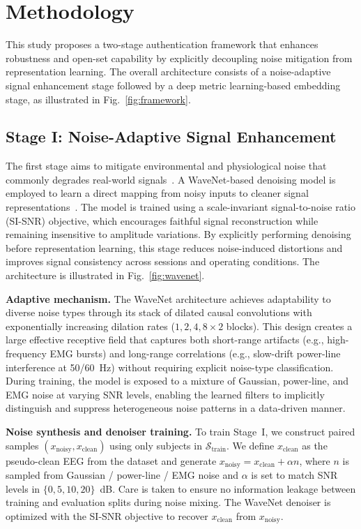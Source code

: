 \documentclass[conference]{IEEEtran}
\begin{document}
\section{Methodology}

This study proposes a two-stage authentication framework that enhances robustness and open-set capability by explicitly decoupling noise mitigation from representation learning. The overall architecture consists of a noise-adaptive signal enhancement stage followed by a deep metric learning-based embedding stage, as illustrated in Fig.~\ref{fig:framework}.

\subsection{Stage I: Noise-Adaptive Signal Enhancement}

The first stage aims to mitigate environmental and physiological noise that commonly degrades real-world signals~\cite{b4}. A WaveNet-based denoising model is employed to learn a direct mapping from noisy inputs to cleaner signal representations~\cite{b14}. The model is trained using a scale-invariant signal-to-noise ratio (SI-SNR) objective, which encourages faithful signal reconstruction while remaining insensitive to amplitude variations. By explicitly performing denoising before representation learning, this stage reduces noise-induced distortions and improves signal consistency across sessions and operating conditions. The architecture is illustrated in Fig.~\ref{fig:wavenet}.

\textbf{Adaptive mechanism.} The WaveNet architecture achieves adaptability to diverse noise types through its stack of dilated causal convolutions with exponentially increasing dilation rates ($1, 2, 4, 8 \times 2$ blocks). This design creates a large effective receptive field that captures both short-range artifacts (e.g., high-frequency EMG bursts) and long-range correlations (e.g., slow-drift power-line interference at 50/60~Hz) without requiring explicit noise-type classification. During training, the model is exposed to a mixture of Gaussian, power-line, and EMG noise at varying SNR levels, enabling the learned filters to implicitly distinguish and suppress heterogeneous noise patterns in a data-driven manner.

\textbf{Noise synthesis and denoiser training.} To train Stage~I, we construct paired samples $(x_{\text{noisy}}, x_{\text{clean}})$ using only subjects in $\mathcal{S}_{\text{train}}$. We define $x_{\text{clean}}$ as the pseudo-clean EEG from the dataset and generate $x_{\text{noisy}} = x_{\text{clean}} + \alpha n$, where $n$ is sampled from Gaussian / power-line / EMG noise and $\alpha$ is set to match SNR levels in $\{0, 5, 10, 20\}$~dB. Care is taken to ensure no information leakage between training and evaluation splits during noise mixing. The WaveNet denoiser is optimized with the SI-SNR objective to recover $x_{\text{clean}}$ from $x_{\text{noisy}}$.
\end{document}
